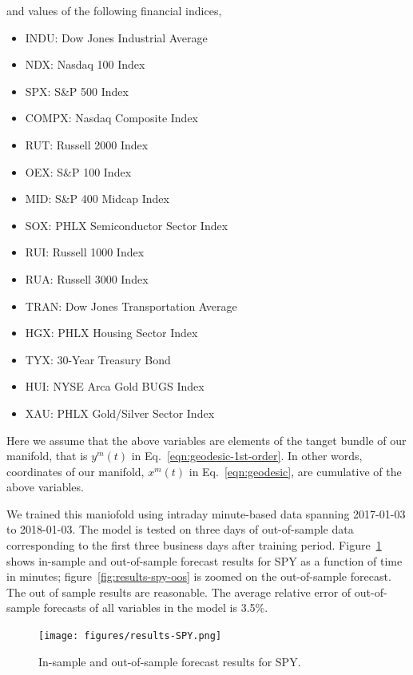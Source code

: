 \documentclass{article}
\begin{document}
and values of the following financial indices,

\begin{itemize}
    \item[] INDU:  Dow Jones Industrial Average 
    \item[] NDX:   Nasdaq 100 Index 
    \item[] SPX:   S\&P 500 Index 
    \item[] COMPX: Nasdaq Composite Index 
    \item[] RUT:   Russell 2000 Index 
    \item[] OEX:   S\&P 100 Index 
    \item[] MID:   S\&P 400 Midcap Index 
    \item[] SOX:   PHLX Semiconductor Sector Index 
    \item[] RUI:   Russell 1000 Index 
    \item[] RUA:   Russell 3000 Index 
    \item[] TRAN:  Dow Jones Transportation Average 
    \item[] HGX:   PHLX Housing Sector Index 
    \item[] TYX:   30-Year Treasury Bond 
    \item[] HUI:   NYSE Arca Gold BUGS Index 
    \item[] XAU:   PHLX Gold/Silver Sector Index
\end{itemize}

Here we assume that the above variables are elements of the tanget
bundle of our manifold, that is $y^{m}(t)$ in
Eq.~\ref{eqn:geodesic-1st-order}. In other words, coordinates of our
manifold, $x^{m}(t)$ in Eq.~\ref{eqn:geodesic}, are cumulative of the
above variables.

We trained this maniofold using intraday minute-based data spanning
2017-01-03 to 2018-01-03. The model is tested on three days of
out-of-sample data corresponding to the first three business days
after training period. Figure~\ref{fig:results-spy} shows in-sample
and out-of-sample forecast results for SPY as a function of time in
minutes; figure~\ref{fig:results-spy-oos} is zoomed on the
out-of-sample forecast. The out of sample results are reasonable. The
average relative error of out-of-sample forecasts of all variables in
the model is 3.5\%.

\begin{figure}\label{fig:results-spy}
\texttt{[image: figures/results-SPY.png]}
\caption{In-sample and out-of-sample forecast results for SPY.}
\end{figure}
\end{document}
